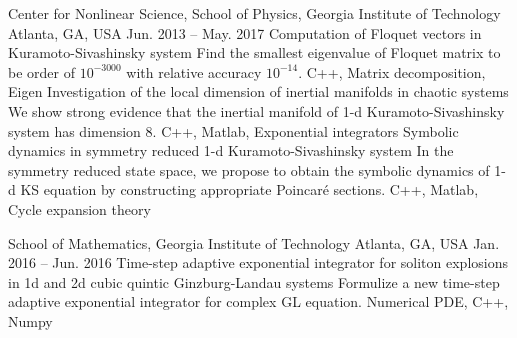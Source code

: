


\begin{cventries}
  \cvresearch
  {Center for Nonlinear Science, School of Physics, Georgia Institute of Technology}
  {Atlanta, GA, USA}
  {Jun. 2013 -- May. 2017}
  {
    \cvresearchitem
    {Computation of Floquet vectors in Kuramoto-Sivashinsky system}
    {Find the smallest eigenvalue of Floquet matrix to be order of $10^{-3000}$ with relative accuracy $10^{-14}$.}
    {C++, Matrix decomposition, Eigen}
    \cvresearchitem
    {Investigation of the local dimension of inertial manifolds in chaotic systems}
    {We show strong evidence that the inertial manifold of 1-d Kuramoto-Sivashinsky system has dimension 8.}
    {C++, Matlab, Exponential integrators}
    \cvresearchitem
    {Symbolic dynamics in symmetry reduced 1-d Kuramoto-Sivashinsky system}
    {In the symmetry reduced state space, we propose to obtain the symbolic dynamics of 1-d KS equation by constructing appropriate Poincar\'e sections.}
    {C++, Matlab, Cycle expansion theory}
  }

  \cvresearch
  {School of Mathematics, Georgia Institute of Technology} 
  {Atlanta, GA, USA}
  {Jan. 2016 -- Jun. 2016} 
  {
    \cvresearchitem
    {Time-step adaptive exponential integrator for soliton explosions in 1d and 2d cubic quintic Ginzburg-Landau systems}
    {Formulize a new time-step adaptive exponential integrator for complex GL equation.}
    {Numerical PDE, C++, Numpy}
  }


\end{cventries}
